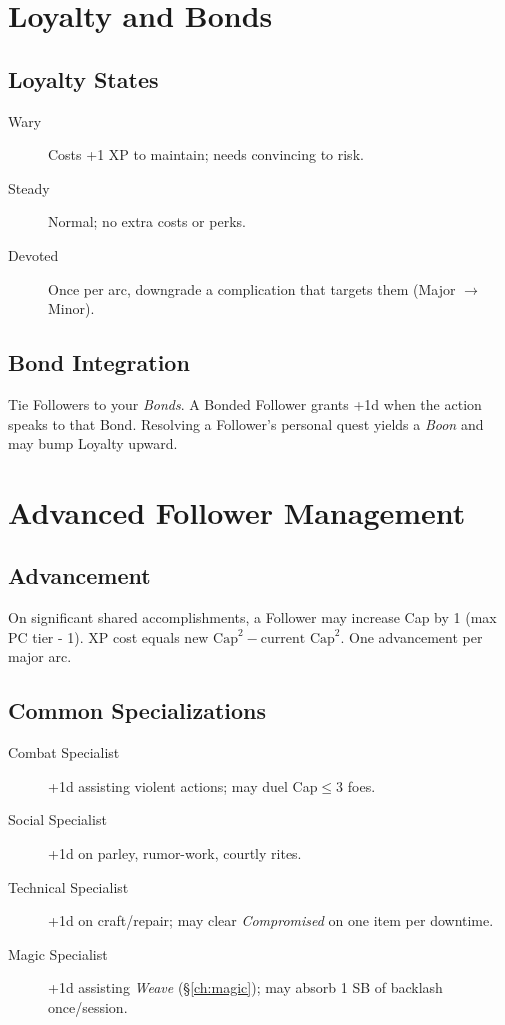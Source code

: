 \begin{multicols}{2}
\section{Loyalty and Bonds}

\subsection*{Loyalty States}
\begin{description}
  \item[Wary] Costs +1 XP to maintain; needs convincing to risk.
  \item[Steady] Normal; no extra costs or perks.
  \item[Devoted] Once per arc, downgrade a complication that targets them (Major \(\rightarrow\) Minor). 
\end{description}

\subsection*{Bond Integration}
Tie Followers to your \emph{Bonds}. A Bonded Follower grants +1d when the action speaks to that Bond. Resolving a Follower’s personal quest yields a \emph{Boon} and may bump Loyalty upward.

\section{Advanced Follower Management}

\subsection*{Advancement}
On significant shared accomplishments, a Follower may increase Cap by 1 (max PC tier - 1). XP cost equals \(\text{new Cap}^2 - \text{current Cap}^2\). One advancement per major arc.

\subsection*{Common Specializations}
\begin{description}
  \item[Combat Specialist] +1d assisting violent actions; may duel Cap\(\leq\)3 foes.
  \item[Social Specialist] +1d on parley, rumor-work, courtly rites.
  \item[Technical Specialist] +1d on craft/repair; may clear \emph{Compromised} on one item per downtime.
  \item[Magic Specialist] +1d assisting \emph{Weave} (\S\ref{ch:magic}); may absorb 1 SB of backlash once/session. 
\end{description}


\end{multicols}
